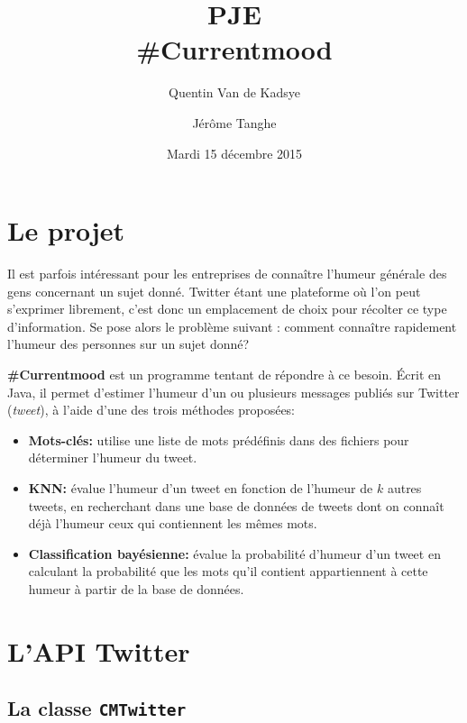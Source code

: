 \documentclass[12pt,a4paper]{report}
\title{PJE\\\#Currentmood}
\author{Quentin Van de Kadsye \and Jérôme Tanghe}
\date{Mardi 15 décembre 2015}
\begin{document}
\maketitle

\tableofcontents


\chapter{Le projet}

Il est parfois intéressant pour les entreprises de connaître l'humeur générale
des gens concernant un sujet donné. Twitter étant une plateforme où l'on peut
s'exprimer librement, c'est donc un emplacement de choix pour récolter ce type
d'information. Se pose alors le problème suivant : comment connaître rapidement
l'humeur des personnes sur un sujet donné?

\textbf{\#Currentmood} est un programme tentant de répondre à ce besoin. Écrit
en Java, il permet d'estimer l'humeur d'un ou plusieurs messages publiés sur
Twitter (\textit{tweet}), à l'aide d'une des trois méthodes proposées:

\begin{itemize}
    \item
        \textbf{Mots-clés:} utilise une liste de mots prédéfinis dans des
        fichiers pour déterminer l'humeur du tweet.
    \item
        \textbf{KNN:} évalue l'humeur d'un tweet en fonction de l'humeur de $k$
        autres tweets, en recherchant dans une base de données de tweets dont on
        connaît déjà l'humeur ceux qui contiennent les mêmes mots.
    \item
        \textbf{Classification bayésienne:} évalue la probabilité d'humeur d'un
        tweet en calculant la probabilité que les mots qu'il contient
        appartiennent à cette humeur à partir de la base de données.
\end{itemize}



\chapter{L'API Twitter}

\section{La classe \texttt{CMTwitter}}
\end{document}
